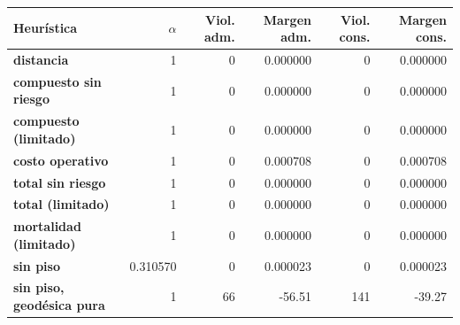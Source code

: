 \renewcommand{\arraystretch}{1.2}
\begin{tabular}{|l|r|r|r|r|r|}
\hline
\rowcolor{gray!20} \textbf{Heurística} & \textbf{$\alpha$} & \textbf{Viol. adm.} & \textbf{Margen adm.} & \textbf{Viol. cons.} & \textbf{Margen cons.} \\
\hline
\textbf{distancia} & 1 & 0 & 0.000000 & 0 & 0.000000 \\
\hline
\textbf{compuesto sin riesgo} & 1 & 0 & 0.000000 & 0 & 0.000000 \\
\hline
\textbf{compuesto (limitado)} & 1 & 0 & 0.000000 & 0 & 0.000000 \\
\hline
\textbf{costo operativo} & 1 & 0 & 0.000708 & 0 & 0.000708 \\
\hline
\textbf{total sin riesgo} & 1 & 0 & 0.000000 & 0 & 0.000000 \\
\hline
\textbf{total (limitado)} & 1 & 0 & 0.000000 & 0 & 0.000000 \\
\hline
\textbf{mortalidad (limitado)} & 1 & 0 & 0.000000 & 0 & 0.000000 \\
\hline
\textbf{sin piso} & 0.310570 & 0 & 0.000023 & 0 & 0.000023 \\
\hline
\textbf{sin piso, geodésica pura} & 1 & 66 & -56.51 & 141 & -39.27 \\
\hline
\end{tabular}
